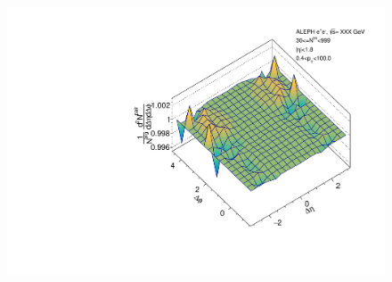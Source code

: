 \begin{figure}[htbp]
\begin{minipage}[b]{0.32\linewidth}
  \end{minipage}
  \begin{minipage}[b]{0.32\linewidth}
    \centering
    \includegraphics[width=\linewidth]{images/TwoParticleCorrelation/LEP1_BEAM/LEP1_BEAM_r_ratio_30_999.pdf}
    \label{fig:LEP1 Beam Axis, Ratio Plot, Multiplicity 30-999, Ratio}
  \end{minipage}
\end{figure}



